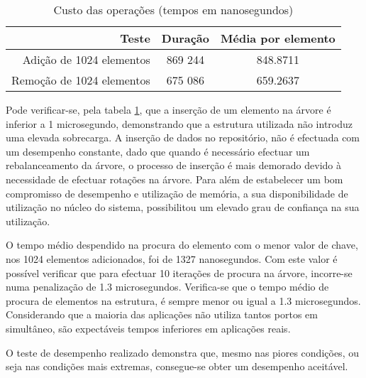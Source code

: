 \begin{table}[!htb]
\begin{center}
\caption{Custo das operações (tempos em nanosegundos)}
\begin{tabular}{ | r | c | c | }
\hline
\hspace{1cm} Teste \hspace{1.5cm} & \hspace{1cm}Duração\hspace{1cm} &  Média por
elemento \\
\hline
Adição de 1024 elementos & 869 244 & 848.8711 \\
\hline
Remoção de 1024 elementos & 675 086 & 659.2637\\
\hline

\hline
\end{tabular}
\label{tab:tree_info}
\end{center}
\end{table}

Pode verificar-se, pela tabela \ref{tab:tree_info}, que a inserção de um elemento na árvore é inferior a 1 microsegundo, demonstrando que a estrutura utilizada não introduz uma elevada sobrecarga.
A inserção de dados no repositório, não é efectuada com um desempenho constante, dado que quando é necessário efectuar um rebalanceamento da árvore, o processo de inserção é mais demorado devido à necessidade de efectuar rotações na árvore.
Para além de estabelecer um bom compromisso de desempenho e utilização de memória, a sua disponibilidade de utilização no núcleo do sistema, possibilitou um elevado grau de confiança na sua utilização.

O tempo médio despendido na procura do elemento com o menor valor de chave, nos 1024 elementos adicionados, foi de 1327 nanosegundos.
Com este valor é possível verificar que para efectuar 10 iterações de procura na árvore, incorre-se numa penalização de 1.3 microsegundos.
Verifica-se que o tempo médio de procura de elementos na estrutura, é sempre menor ou igual a 1.3 microsegundos.
Considerando que a maioria das aplicações não utiliza tantos portos em simultâneo, são expectáveis tempos inferiores em aplicações reais.

O teste de desempenho realizado demonstra que, mesmo nas piores condições, ou seja nas condições mais extremas, consegue-se obter um desempenho aceitável.

